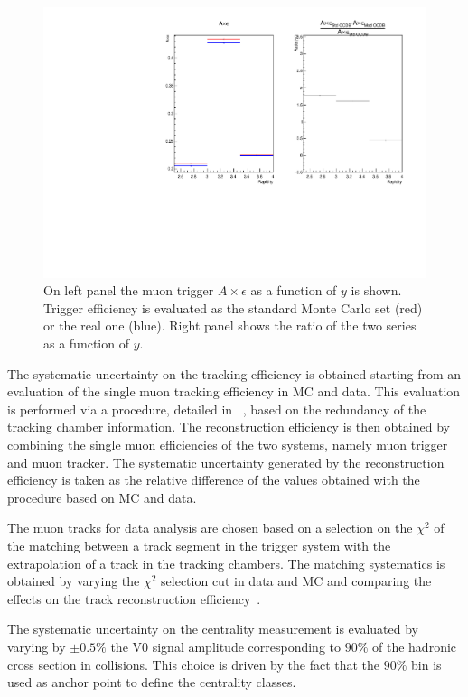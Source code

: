 \begin{figure}[!htb]
\begin{center}
\includegraphics[width=0.9\linewidth]{Chapters/Analysis/Figs/AxEffSystError_NOCUT.pdf}
\caption{On left panel the muon trigger $A\times\epsilon$ as a function of $y$ is shown. Trigger efficiency is evaluated as the standard Monte Carlo set (red) or the real one (blue). Right panel shows the ratio of the two series as a function of $y$.}
\label{fig:trigsystAxe}
\end{center}
\end{figure}

The systematic uncertainty on the tracking efficiency is obtained starting from an evaluation of the single muon tracking efficiency in MC and data. 
This evaluation is performed via a procedure, detailed in ~\cite{Adam:2015isa}, based on the redundancy of the tracking chamber information.
The \upsi reconstruction efficiency is then obtained by combining the single muon efficiencies of the two systems, namely muon trigger and muon tracker.
The systematic uncertainty generated by the \upsi reconstruction efficiency is taken as the relative difference of the values obtained with the procedure based on MC and data.

The muon tracks for data analysis are chosen based on a selection on the $\chi^2$ of the matching between a track segment in the trigger system with the extrapolation of a track in the tracking chambers. 
The matching systematics is obtained by varying the $\chi^2$ selection cut in data and MC and comparing the effects on the track reconstruction efficiency~\cite{Adam:2016rdg}.

The systematic uncertainty on the centrality measurement is evaluated by varying by $\pm0.5\%$ the V0 signal amplitude corresponding to $90\%$ of the hadronic cross section in \pbpb collisions.
This choice is driven by the fact that the $90\%$ bin is used as anchor point to define the centrality classes.

